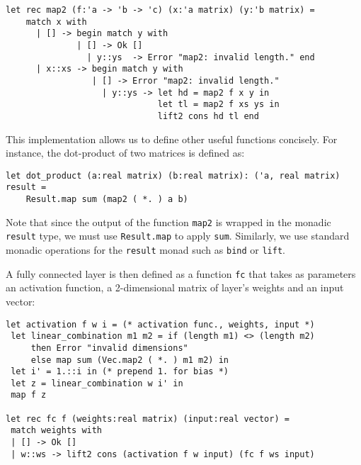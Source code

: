 \documentclass[runningheads]{llncs}
\begin{document}
\begin{lstlisting}[frame=none, language=caml]
  let rec map2 (f:'a -> 'b -> 'c) (x:'a matrix) (y:'b matrix) =
    match x with
	  | [] -> begin match y with
   		      | [] -> Ok []
		        | y::ys  -> Error "map2: invalid length." end
 	  | x::xs -> begin match y with 
  		         | [] -> Error "map2: invalid length." 
		           | y::ys -> let hd = map2 f x y in
		                      let tl = map2 f xs ys in
		                      lift2 cons hd tl end
\end{lstlisting}

This implementation allows us to define other useful functions concisely. For instance, the dot-product of two matrices %
is defined as:

\begin{lstlisting}[frame=none, language=caml]
let dot_product (a:real matrix) (b:real matrix): ('a, real matrix) result =
	Result.map sum (map2 ( *. ) a b)
\end{lstlisting}

Note that since the output of the function \lstinline{map2} is wrapped in the monadic \lstinline{result} type, we must use \lstinline{Result.map} to apply \lstinline|sum|. Similarly, we use standard monadic operations for the \lstinline|result| monad such as \lstinline|bind| or \lstinline|lift|.




A fully connected layer is then defined as a function \lstinline{fc} that takes
as parameters an activation function, a 2-dimensional matrix of
layer's weights and an input vector:
\begin{lstlisting}[caption=Fully connected layer implementation, language=caml, label={lst:fully_connected}]
let activation f w i = (* activation func., weights, input *)
 let linear_combination m1 m2 = if (length m1) <> (length m2)
     then Error "invalid dimensions" 
     else map sum (Vec.map2 ( *. ) m1 m2) in
 let i' = 1.::i in (* prepend 1. for bias *)
 let z = linear_combination w i' in
 map f z
	
let rec fc f (weights:real matrix) (input:real vector) =
 match weights with
 | [] -> Ok []
 | w::ws -> lift2 cons (activation f w input) (fc f ws input)
\end{lstlisting}
\end{document}
